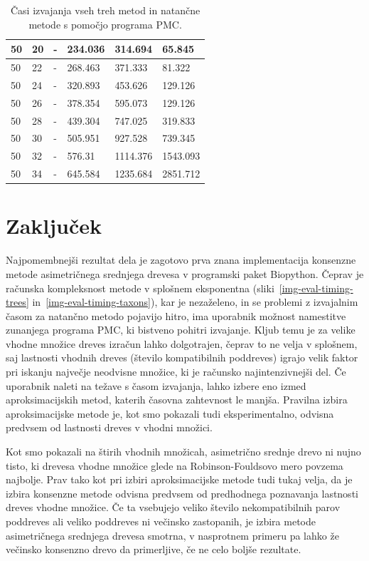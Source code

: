 \documentclass[a4paper, 12pt]{book}
\begin{document}
\begin{table}[h!]
\begin{center}
{\begin{tabular}{ l| l | l | l | l | l }
	50             & 20         & -           & 234.036   & 314.694   & 65.845      \\ \hline
	50             & 22         & -           & 268.463   & 371.333   & 81.322      \\ \hline
	50             & 24         & -           & 320.893   & 453.626   & 129.126     \\ \hline
	50             & 26         & -           & 378.354   & 595.073   & 129.126     \\ \hline
	50             & 28         & -           & 439.304   & 747.025   & 319.833     \\ \hline
	50             & 30         & -           & 505.951   & 927.528   & 739.345     \\ \hline
	50             & 32         & -           & 576.31    & 1114.376  & 1543.093    \\ \hline
	50             & 34         & -           & 645.584   & 1235.684  & 2851.712    \\ \hline
	\end{tabular}
	\label{table-eval-timing}
	\caption{
	 Časi izvajanja vseh treh metod in natančne metode s pomočjo programa PMC.
	 }
	}
	\end{center}		
\end{table}

\chapter{Zaključek}
Najpomembnejši rezultat dela je zagotovo prva znana implementacija konsenzne metode
asimetričnega srednjega drevesa v programski paket Biopython. Čeprav je računska 
kompleksnost metode v splošnem eksponentna (sliki~\ref{img-eval-timing-trees} 
in~\ref{img-eval-timing-taxons}), kar je nezaželeno, in se problemi z
izvajalnim časom za natančno metodo pojavijo hitro, ima uporabnik možnost namestitve 
zunanjega programa PMC, ki bistveno pohitri izvajanje. Kljub temu je za velike vhodne 
množice dreves izračun lahko dolgotrajen, čeprav to ne velja v splošnem,
saj lastnosti vhodnih dreves (število kompatibilnih poddreves) igrajo velik faktor pri
iskanju največje neodvisne množice, ki je računsko najintenzivnejši del. Če 
uporabnik naleti na težave s časom izvajanja, lahko izbere eno izmed 
aproksimacijskih metod, katerih časovna zahtevnost le manjša. Pravilna izbira 
aproksimacijske metode je, kot smo pokazali tudi eksperimentalno, odvisna 
predvsem od lastnosti dreves v vhodni množici. 

Kot smo pokazali na štirih vhodnih množicah, asimetrično srednje drevo ni nujno 
tisto, ki drevesa vhodne množice glede na Robinson-Fouldsovo mero povzema 
najbolje. Prav tako kot pri izbiri aproksimacijske metode tudi tukaj velja, da 
je izbira konsenzne metode odvisna predvsem od predhodnega poznavanja lastnosti 
dreves vhodne množice. Če ta vsebujejo veliko število nekompatibilnih parov 
poddreves ali veliko poddreves ni večinsko zastopanih, je izbira metode 
asimetričnega srednjega drevesa smotrna, v nasprotnem primeru pa lahko že 
večinsko konsenzno drevo da primerljive, če ne celo boljše rezultate.
\end{document}
